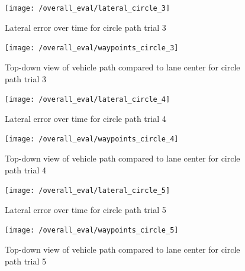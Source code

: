 \documentclass[titlepage, draft]{article}
\begin{document}
{\begin{figure}[H]
	\centering
	\begin{minipage}{.45\textwidth}
		\centering
		\texttt{[image: /overall\_eval/lateral\_circle\_3]}
		\caption{Lateral error over time for circle path trial 3}
		\label{fig:circle_lat_3}
	\end{minipage}%
	\hspace{0.1\textwidth}%
	\begin{minipage}{.45\textwidth}
		\centering
		\texttt{[image: /overall\_eval/waypoints\_circle\_3]}
		\caption{Top-down view of vehicle path compared to lane center for circle path trial 3}
		\label{fig:circle_way_3}
	\end{minipage}
\end{figure}

\begin{figure}[H]
	\centering
	\begin{minipage}{.45\textwidth}
		\centering
		\texttt{[image: /overall\_eval/lateral\_circle\_4]}
		\caption{Lateral error over time for circle path trial 4}
		\label{fig:circle_lat_4}
	\end{minipage}%
	\hspace{0.1\textwidth}%
	\begin{minipage}{.45\textwidth}
		\centering
		\texttt{[image: /overall\_eval/waypoints\_circle\_4]}
		\caption{Top-down view of vehicle path compared to lane center for circle path trial 4}
		\label{fig:circle_way_4}
	\end{minipage}
\end{figure}

\begin{figure}[H]
	\centering
	\begin{minipage}{.45\textwidth}
		\centering
		\texttt{[image: /overall\_eval/lateral\_circle\_5]}
		\caption{Lateral error over time for circle path trial 5}
		\label{fig:circle_lat_5}
	\end{minipage}%
	\hspace{0.1\textwidth}%
	\begin{minipage}{.45\textwidth}
		\centering
		\texttt{[image: /overall\_eval/waypoints\_circle\_5]}
		\caption{Top-down view of vehicle path compared to lane center for circle path trial 5}
		\label{fig:circle_way_5}
	\end{minipage}
\end{figure}








}
\end{document}
